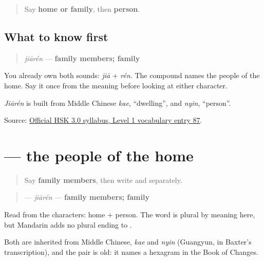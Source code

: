 \label{lesson:ZH-C12-hear-jiaren}



\begin{quote}
Say \textbf{home or family}, then \textbf{person}.
\end{quote}

\subsection*{What to know first}
\begin{quote}
\emph{jiārén} — \textbf{family members; family}
\end{quote}

You already own both sounds: \emph{jiā} + \emph{rén}. The compound names the people of the home. Say it once from the meaning before looking at either character.

\emph{Jiārén} is built from Middle Chinese \emph{kae}, \textquotedblleft{}dwelling\textquotedblright{}, and \emph{nyin}, \textquotedblleft{}person\textquotedblright{}.

\begin{tcolorbox}[breakable,colback=teal!4,colframe=teal!35!black,title={Before you move on}]
Source: \href{https://hsk.cn-bj.ufileos.com/3.0/\%E6\%96\%B0\%E7\%89\%88HSK\%E8\%80\%83\%E8\%AF\%95\%E5\%A4\%A7\%E7\%BA\%B21219.pdf}{Official HSK 3.0 syllabus, Level 1 vocabulary entry 87}.
\end{tcolorbox}
\section[\texorpdfstring{\zh{家人} (jiārén)}{家人 (jiārén)}]{ — the people of the home}

\label{lesson:ZH-C12-jiaren}



\begin{quote}
Say \textbf{family members}, then write  and  separately.
\end{quote}

\begin{cousinweb}
\begin{quote}
\textbf{} — \emph{jiārén} — \textbf{family members; family}
\end{quote}

Read from the characters: home + person. The word is plural by meaning here, but Mandarin adds no plural ending to .

Both are inherited from Middle Chinese, \emph{kae} and \emph{nyin} (Guangyun, in Baxter's transcription), and the pair is old: it names a hexagram in the Book of Changes.
\end{cousinweb}

